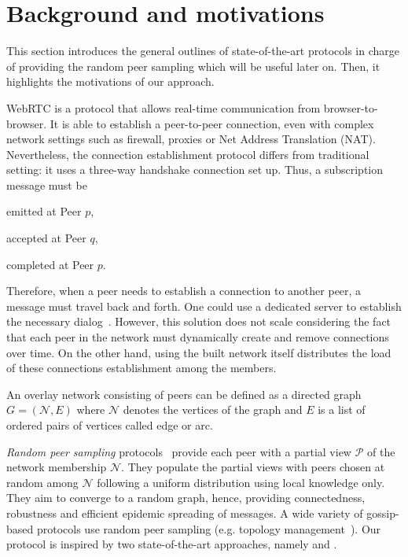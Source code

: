 
\section{Background and motivations}
\label{sec:background}

This section introduces the general outlines of state-of-the-art protocols in
charge of providing the random peer sampling which will be useful later
on. Then, it highlights the motivations of our approach.

\begin{asparadesc}
\item [WebRTC] is a protocol that allows real-time communication from
  browser-to-browser. It is able to establish a peer-to-peer connection, even
  with complex network settings such as firewall, proxies or Net Address
  Translation (NAT). Nevertheless, the connection establishment protocol
  differs from traditional setting: it uses a three-way handshake connection
  set up.  Thus, a subscription message must be
  \begin{inparaenum}[(1)]
  \item emitted at Peer $p$,
  \item accepted at Peer $q$,
  \item completed at Peer $p$.
  \end{inparaenum}
  Therefore, when a peer needs to establish a connection to another peer, a
  message must travel back and forth. One could use a dedicated server to
  establish the necessary dialog~\cite{peerjs}. However, this solution does not
  scale considering the fact that each peer in the network must dynamically
  create and remove connections over time. On the other hand, using the built
  network itself distributes the load of these connections establishment among
  the members.
\end{asparadesc}

\begin{definition}
    \label{def:graph}
  An overlay network consisting of peers can be defined as a directed graph
  $G=(\mathcal{N},E)$ where $\mathcal{N}$ denotes the vertices of the graph
  and $E$ is a list of ordered pairs of vertices called edge or arc.
  \end{definition}

\begin{definition}
    \label{def:rps}
    \emph{Random peer sampling} protocols~\cite{jelasity2004peer} provide each peer
  with a partial view $\mathcal{P}$ of the network membership
  $\mathcal{N}$. They populate the partial views with peers chosen at random
  among $\mathcal{N}$ following a uniform distribution using local knowledge
  only. They aim to converge to a random graph, hence, providing connectedness,
  robustness and efficient epidemic spreading of messages. A wide variety of
  gossip-based protocols use random peer sampling (e.g. topology
  management~\cite{voulgaris2005epidemic, jelasity2009tman,dabek2004vivaldi}).  Our \SCAMPLON{}
  protocol is inspired by two state-of-the-art approaches, namely \SCAMP{} and
  \CYCLON{}.
\end{definition}

